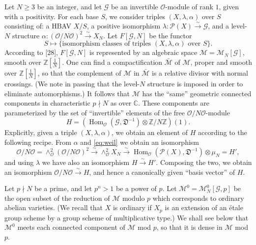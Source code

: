 \documentclass[12pt,a4paper]{article}
\theoremstyle{plain}
\theoremstyle{definition}
\DeclareMathOperator{\Hom}{Hom}
\newcommand{\OO}{\mathcal{O}}
\newcommand{\DD}{\mathfrak{D}}
\newcommand{\Z}{\mathbb{Z}}
\newcommand{\C}{\mathbb{C}}
\begin{document}
Let $N\ge3$ be an integer, and let $\mathscr{G}$ be an invertible $\OO$-module of rank $1$, given with a positivity. For each base $S$, we consider triples $(X,\lambda,\alpha)$ over $S$ consisting of: a HBAV $X/S$, a positive isomorphism $\lambda:\mathscr{P}(X)\xrightarrow{\sim}\mathscr{G}$, and a level-$N$ structure $\alpha:(\OO/N\OO)^2\xrightarrow{\sim}X_N$. Let $F[\mathscr{G},N]$ be the functor
\[
S\mapsto\{\text{isomorphism classes of triples }(X,\lambda,\alpha)\text{ over }S\}.
\]
According to [28], $F[\mathscr{G},N]$ is represented by an algebraic space $\mathscr{M}=\mathscr{M}_N[\mathscr{G}]$, smooth over $\Z[\frac{1}{N}]$. One can find a compactification $\bar{\mathscr{M}}$ of $\mathscr{M}$, proper and smooth over $\Z[\frac{1}{N}]$, so that the complement of $\mathscr{M}$ in $\bar{\mathscr{M}}$ is a relative divisor with normal crossings. (We note in passing that the level-$N$ structure is imposed in order to eliminate automorphisms.) It follows that $\mathscr{M}$ has the ``same'' geometric connected components in characteristic $p\nmid N$ as over $\C$. These components are parameterized by the set of ``invertible'' elements of the free $\OO/N\OO$-module
\[
H=(\Hom_{\OO}(\mathscr{G},\DD^{-1})\otimes\Z/N\Z)(1).
\]
Explicitly, given a triple $(X,\lambda,\alpha)$, we obtain an element of $H$ according to the following recipe. From $\alpha$ and \eqref{eq:weil} we obtain an isomorphism
\[
\OO/N\OO=\wedge^2_{\OO}(\OO/N\OO)^2\xrightarrow{\sim}\wedge^2_{\OO}X_N\xrightarrow{\sim}\Hom_{\OO}(\mathscr{P}(X),\DD^{-1})\otimes\mu_N=H',
\]
and using $\lambda$ we have also an isomorphism $H\xrightarrow{\sim}H'$. Composing the two, we obtain an isomorphism $\OO/N\OO\xrightarrow{\sim}H$, and hence a canonically given ``basis vector'' of $H$.

Let $p\nmid N$ be a prime, and let $p^n>1$ be a power of $p$. Let $\mathscr{M}^0=\mathscr{M}^0_N[\mathscr{G},p]$ be the open subset of the reduction of $\mathscr{M}$ modulo $p$ which corresponds to ordinary abelian varieties. (We recall that $X$ is ordinary if $X_p$ is an extension of an \'etale group scheme by a group scheme of multiplicative type.) We shall see below that $\mathscr{M}^0$ meets each connected component of $\mathscr{M}$ mod $p$, so that it is dense in $\mathscr{M}$ mod $p$.
\end{document}
